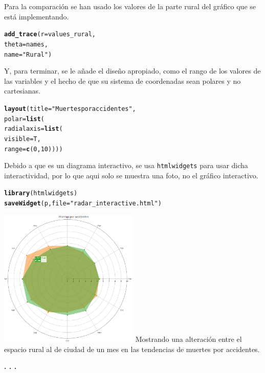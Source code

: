 \documentclass{article}\usepackage[]{graphicx}\usepackage[]{color}
\makeatletter
\newcommand{\hlnum}[1]{\textcolor[rgb]{0.686,0.059,0.569}{#1}}%
\newcommand{\hlstr}[1]{\textcolor[rgb]{0.192,0.494,0.8}{#1}}%
\newcommand{\hlstd}[1]{\textcolor[rgb]{0.345,0.345,0.345}{#1}}%
\newcommand{\hlkwc}[1]{\textcolor[rgb]{0.333,0.667,0.333}{#1}}%
\newcommand{\hlkwd}[1]{\textcolor[rgb]{0.737,0.353,0.396}{\textbf{#1}}}%
\newenvironment{kframe}{%
 \def\at@end@of@kframe{}%
 \ifinner\ifhmode%
  \def\at@end@of@kframe{\end{minipage}}%
  \begin{minipage}{\columnwidth}%
 \fi\fi%
 \def\FrameCommand##1{\hskip\@totalleftmargin \hskip-\fboxsep
 \colorbox{shadecolor}{##1}\hskip-\fboxsep
     \hskip-\linewidth \hskip-\@totalleftmargin \hskip\columnwidth}%
 \MakeFramed {\advance\hsize-\width
   \@totalleftmargin\z@ \linewidth\hsize
   \@setminipage}}%
 {\par\unskip\endMakeFramed%
 \at@end@of@kframe}
\newenvironment{knitrout}{}{} %
\makeatother
\begin{document}
Para la comparaci\'on se han usado los valores de la parte rural del gr\'afico que se est\'a implementando.
\begin{knitrout}
\color{fgcolor}\begin{kframe}
\begin{alltt}
  \hlkwd{add_trace}(r = values_rural,
           theta = names,
           name = \hlstr{"Rural"}) %
\end{alltt}
\end{kframe}
\end{knitrout}
Y, para terminar, se le a\~nade el dise\~no apropiado, como el rango de los valores de las variables y el hecho de que su sistema de coordenadas sean polares y no cartesianas.
\begin{knitrout}
\color{fgcolor}\begin{kframe}
\begin{alltt}
  \hlkwd{layout}\hlstd{(} \hlkwc{title}\hlstd{=} \hlstr{"Muertes por accidentes"}\hlstd{,}
    \hlkwc{polar} \hlstd{=} \hlkwd{list}\hlstd{(}
    \hlkwc{radialaxis} \hlstd{=} \hlkwd{list}\hlstd{(}
      \hlkwc{visible} \hlstd{= T,}
      \hlkwc{range} \hlstd{=} \hlkwd{c}\hlstd{(}\hlnum{0}\hlstd{,} \hlnum{10}\hlstd{))))}
\end{alltt}
\end{kframe}
\end{knitrout}

Debido a que es un diagrama interactivo, se usa \texttt{htmlwidgets}\cite{docu_htmlwidget} para usar dicha interactividad, por lo que aqui solo se muestra una foto, no el gr\'afico interactivo.
\begin{knitrout}
\color{fgcolor}\begin{kframe}
\begin{alltt}
\hlkwd{library}\hlstd{(htmlwidgets)}
\hlkwd{saveWidget}\hlstd{(p,} \hlkwc{file}\hlstd{=}\hlstr{"radar_interactive.html"}\hlstd{)}
\end{alltt}
\end{kframe}
\end{knitrout}
\vbox{
    \centering
    \includegraphics[width=0.5\textwidth]{imag/radar_interactive}
}
Mostrando una alteraci\'on entre el espacio rural al de ciudad de un mes en las tendencias de muertes por accidentes.
\begin{center}
\textbf{. . .}
\end{center}
\end{document}
